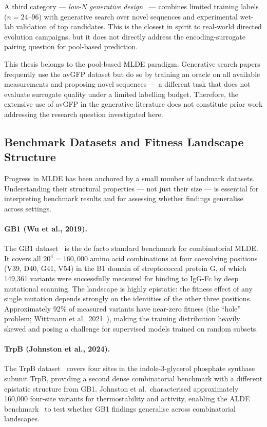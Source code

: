 \documentclass[english, 12pt, a4paper, elec, utf8, a-2b, online]{aaltothesis}
\begin{document}
A third category --- \emph{low-N generative design}~\cite{Biswas2021LowN} ---
combines limited training labels ($n = 24$--$96$) with generative search over novel
sequences and experimental wet-lab validation of top candidates.
This is the closest in spirit to real-world directed evolution campaigns, but it does not
directly address the encoding-surrogate pairing question for pool-based prediction.

This thesis belongs to the pool-based MLDE paradigm.
Generative search papers frequently use the avGFP dataset but do so by training an
oracle on all available measurements and proposing novel sequences --- a different
task that does not evaluate surrogate quality under a limited labelling budget.
Therefore, the extensive use of avGFP in the generative literature does not constitute
prior work addressing the research question investigated here.

\subsection{Benchmark Datasets and Fitness Landscape Structure}
\label{sec:litrev:datasets}

Progress in MLDE has been anchored by a small number of landmark datasets.
Understanding their structural properties --- not just their size --- is essential for
interpreting benchmark results and for assessing whether findings generalise across settings.

\paragraph{GB1 (Wu et al., 2019).}
The GB1 dataset~\cite{Wu2019} is the de facto standard benchmark for combinatorial MLDE.
It covers all $20^4 = 160{,}000$ amino acid combinations at four coevolving positions
(V39, D40, G41, V54) in the B1 domain of streptococcal protein G,
of which 149,361 variants were successfully measured for binding to IgG-Fc by
deep mutational scanning.
The landscape is highly epistatic: the fitness effect of any single mutation depends strongly
on the identities of the other three positions.
Approximately 92\% of measured variants have near-zero fitness (the ``hole'' problem;
Wittmann et al.\ 2021~\cite{Wittmann2021}), making the training distribution heavily skewed
and posing a challenge for supervised models trained on random subsets.

\paragraph{TrpB (Johnston et al., 2024).}
The TrpB dataset~\cite{Johnston2024} covers four sites in the indole-3-glycerol phosphate
synthase subunit TrpB, providing a second dense combinatorial benchmark with a different
epistatic structure from GB1.
Johnston et al.\ characterised approximately 160,000 four-site variants for thermostability
and activity, enabling the ALDE benchmark~\cite{Yang2025} to test whether GB1 findings
generalise across combinatorial landscapes.
\end{document}
